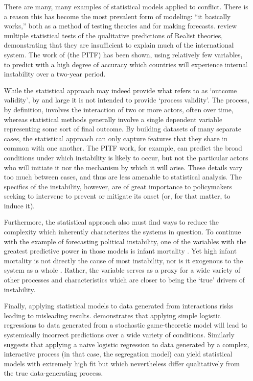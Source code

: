 There are many, many examples of statistical models applied to conflict. There is a reason this has become the most prevalent form of modeling: ``it basically works,'' \citep{schrodt_2004} both as a method of testing theories and for making forecasts. \citet{wayman_1994} review multiple statistical tests of the qualitative predictions of Realist theories, demonstrating that they are insufficient to explain much of the international system. The work of \citet{goldstone_2005} (the PITF) has been shown, using relatively few variables, to predict with a high degree of accuracy which countries will experience internal instability over a two-year period.

While the statistical approach may indeed provide what \citet{schrodt_2004} refers to as `outcome validity', by and large it is not intended to provide `process validity'. The process, by definition, involves the interaction of two or more actors, often over time, whereas statistical methods generally involve a single dependent variable representing some sort of final outcome. By building datasets of many separate cases, the statistical approach can only capture features that they share in common with one another. The PITF work, for example, can predict the broad conditions under which instability is likely to occur, but not the particular actors who will initiate it nor the mechanism by which it will arise. These details vary too much between cases, and thus are less amenable to statistical analysis. The specifics of the instability, however, are of great importance to policymakers seeking to intervene to prevent or mitigate its onset (or, for that matter, to induce it).

Furthermore, the statistical approach also must find ways to reduce the complexity which inherently characterizes the systems in question. To continue with the example of forecasting political instability, one of the variables with the greatest predictive power in those models is infant mortality \citep{goldstone_2005}. Yet high infant mortality is not directly the cause of most instability, nor is it exogenous to the system as a whole \citep{marshall_2008}. Rather, the variable serves as a proxy for a wide variety of other processes and characteristics which are closer to being the `true' drivers of instability.

Finally, applying statistical models to data generated from interactions risks leading to misleading results. \citet{signorino_1999} demonstrates that applying simple logistic regressions to data generated from a stochastic game-theoretic model will lead to systemically incorrect predictions over a wide variety of conditions. Similarly \citet{masad_2014} suggests that applying a naive logistic regression to data generated by a complex, interactive process (in that case, the \citet{schelling_1971} segregation model) can yield statistical models with extremely high fit but which nevertheless differ qualitatively from the true data-generating process.

